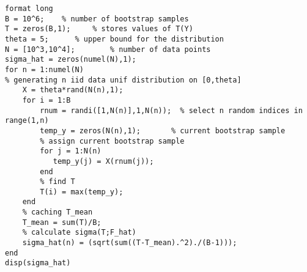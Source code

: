 \lstset{basicstyle=\footnotesize,style=myCustomMatlabStyle}
\begin{lstlisting}
format long
B = 10^6;    % number of bootstrap samples
T = zeros(B,1);     % stores values of T(Y)
theta = 5;      % upper bound for the distribution
N = [10^3,10^4];        % number of data points
sigma_hat = zeros(numel(N),1);
for n = 1:numel(N)
% generating n iid data unif distribution on [0,theta]
    X = theta*rand(N(n),1);
    for i = 1:B
        rnum = randi([1,N(n)],1,N(n));  % select n random indices in range(1,n)
        temp_y = zeros(N(n),1);       % current bootstrap sample
        % assign current bootstrap sample
        for j = 1:N(n)
           temp_y(j) = X(rnum(j)); 
        end
        % find T
        T(i) = max(temp_y);
    end    
    % caching T_mean
    T_mean = sum(T)/B;
    % calculate sigma(T;F_hat)
    sigma_hat(n) = (sqrt(sum((T-T_mean).^2)./(B-1)));
end
disp(sigma_hat)



\end{lstlisting}